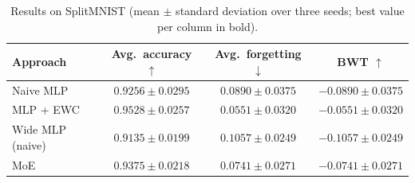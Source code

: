 \begin{table}[H]
  \centering
  \small
  \caption{Results on SplitMNIST (mean $\pm$ standard deviation over three seeds; best value per column in bold).}
  \label{tab:results_split_mnist}
  \begin{tabular}{lccc}
    \toprule
    \textbf{Approach} & \textbf{Avg.\ accuracy} $\uparrow$ & \textbf{Avg.\ forgetting} $\downarrow$ & \textbf{BWT} $\uparrow$ \\
    \midrule
    Naive MLP & $0.9256 \pm 0.0295$ & $0.0890 \pm 0.0375$ & $-0.0890 \pm 0.0375$ \\
    MLP + EWC & \textbf{$0.9528 \pm 0.0257$} & \textbf{$0.0551 \pm 0.0320$} & \textbf{$-0.0551 \pm 0.0320$} \\
    Wide MLP (naive) & $0.9135 \pm 0.0199$ & $0.1057 \pm 0.0249$ & $-0.1057 \pm 0.0249$ \\
    MoE & $0.9375 \pm 0.0218$ & $0.0741 \pm 0.0271$ & $-0.0741 \pm 0.0271$ \\
    \bottomrule
  \end{tabular}
\end{table}
